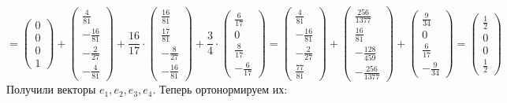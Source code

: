 \documentclass[a4paper,12pt]{article}
\begin{document}
\[
=
\begin{pmatrix}
0 \\ 0 \\ 0 \\ 1
\end{pmatrix}  + \begin{pmatrix}
\frac{4}{81} \\ -\frac{16}{81} \\ -\frac{2}{27} \\ -\frac{4}{81}
\end{pmatrix}
+ \frac{16}{17} \cdot \begin{pmatrix}
\frac{16}{81} \\ \frac{17}{81} \\-\frac{8}{27} \\ -\frac{16}{81} 
\end{pmatrix} + \frac{3}{4} \cdot \begin{pmatrix}
\frac{6}{17} \\ 0 \\ \frac{8}{17} \\ -\frac{6}{17}
\end{pmatrix} = \begin{pmatrix}
\frac{4}{81} \\ -\frac{16}{81} \\ -\frac{2}{27} \\ \frac{77}{81}
\end{pmatrix} + \begin{pmatrix}
\frac{256}{1377} \\ \frac{16}{81} \\ -\frac{128}{459} \\ -\frac{256}{1377}
\end{pmatrix}
+
\begin{pmatrix}
\frac{9}{34} \\ 0 \\ \frac{6}{17} \\ -\frac{9}{34}
\end{pmatrix}
=
\begin{pmatrix}
\frac{1}{2} \\ 0 \\ 0 \\ \frac{1}{2}
\end{pmatrix}
\]
Получили векторы $e_1, e_2, e_3, e_4$. Теперь ортонормируем их:
\end{document}
